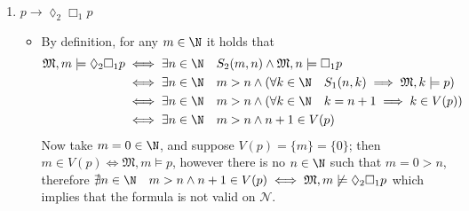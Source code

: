 \documentclass[a4paper, 12pt]{report}
\begin{document}
{\begin{enumerate}[label=(\alph*)]
\begin{itemize}
\begin{equation*}
\begin{split}
                                                                           &\iff \exists t \in \mathbb B \quad (t = s0 \lor t = s1) \land (\forall u \in \mathbb B \quad u \sqsubset t \implies u \in V(p))
                            \end{split}
                        \end{equation*}
                        Now take $s = 00 \in \mathbb B$, and suppose $V(p) = \{s\} = \{00\}$; then $s \in V(p) \iff \mathfrak M', s \models p$, however if $t = s0$ or $t = s1$, there still is $u = 0$ such that $u = 0\sqsubset 00 = t$ although $u = 0 \notin V(p)$, therefore $(t = s0 \lor t = s1) \implies (\exists u \in \mathbb B \quad u \sqsubset t \land u \notin V(p)) \iff \mathfrak M', s \not\models \lozenge_1 \Box_2 p$ which implies that the formula is not valid on $\mathcal B$.
                \end{itemize}
            \item $p \rightarrow \lozenge_2 \Box_1 p$
                \begin{itemize}
                    \item By definition, for any $m \in \N$ it holds that
                        \begin{equation*}
                            \begin{split}
                                \mathfrak M, m \models \lozenge_2 \Box_1 p &\iff \exists n \in \N \quad S_2(m, n) \land \mathfrak M, n \models \Box_1 p \\
                                                                           &\iff \exists n \in \N \quad m > n \land (\forall k \in \N \quad S_1(n, k) \implies \mathfrak M, k \models p) \\
                                                                           &\iff \exists n \in \N \quad m > n \land (\forall k \in \N \quad k = n + 1 \implies k \in V(p)) \\
                                                                           &\iff \exists n \in \N \quad m > n \land n + 1 \in V(p)
                            \end{split}
                        \end{equation*}
                        Now take $m = 0 \in \N$, and suppose $V(p) = \{m\} = \{0\}$; then $m \in V(p) \iff \mathfrak M, m \models p$, however there is no $n \in \N$ such that $m = 0 > n$, therefore $\nexists n \in \N \quad m > n \land n + 1 \in V(p) \iff \mathfrak M, m \not\models \lozenge_2 \Box_1 p$ which implies that the formula is not valid on $\mathcal N$.

\end{itemize}
\end{enumerate}}
\end{document}
